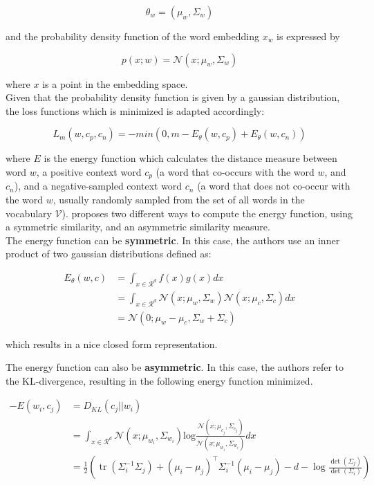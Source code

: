 \documentclass[a4paper,12pt,twoside,openright]{report}
\begin{document}
$$
\theta_w = ( \mu_w,  \Sigma_w)
$$

and the probability density function of the word embedding $x_w$ is expressed by

\begin{equation}
p(x; w) = \mathcal{N}\left(x ; \mu_{w}, \Sigma_{w}\right)
\end{equation}

where $x$ is a point in the embedding space. \\

Given that the probability density function is given by a gaussian distribution, the loss functions which is minimized is adapted accordingly:

\begin{equation}
L_m(w, c_p, c_n) = - min(0, m - E_\theta(w, c_p) + E_\theta(w, c_n) )
\end{equation}

where $E$ is the energy function which calculates the distance measure between word $w$, a positive context word $c_p$ (a word that co-occurs with the word $w$, and $c_n$), and a negative-sampled context word $c_n$ (a word that does not co-occur with the word $w$, usually randomly sampled from the set of all words in the vocabulary $\mathcal{V}$).
\cite{vilnis14} proposes two different ways to compute the energy function, using a symmetric similarity, and an asymmetric similarity measure. \\

The energy function can be \textbf{symmetric}.
In this case, the authors use an inner product of two gaussian distributions defined as:

\begin{align}
E_\theta(w, c) &= \int_{x \in \mathcal{R}^d} f(x)g(x) dx \\
&= \int_{x \in \mathcal{R}^d} \mathcal{N}(x; \mu_w, \Sigma_w) \mathcal{N}(x; \mu_c, \Sigma_c) dx \\
&= \mathcal{N}(0; \mu_w - \mu_c, \Sigma_w + \Sigma_c)
\end{align}

which results in a nice closed form representation. 

The energy function can also be \textbf{asymmetric}.
In this case, the authors refer to the KL-divergence, resulting in the following energy function minimized.

\begin{align}
-E(w_i, c_j) & = D_{KL}(c_j || w_i) \\
&= \int_{x \in \mathcal{R}^d} \mathcal{N}(x; \mu_{w_i}, \Sigma_{w_i}) \text{log} \frac{\mathcal{N}(x; \mu_{c_j}, \Sigma_{c_j})}{\mathcal{N}(x; \mu_{w_i}, \Sigma_{w_i})} dx \\
&= \frac{1}{2}\left(\operatorname{tr}\left(\Sigma_{i}^{-1} \Sigma_{j}\right)+\left(\mu_{i}-\mu_{j}\right)^{\top} \Sigma_{i}^{-1}\left(\mu_{i}-\mu_{j}\right)-d-\log \frac{\operatorname{det}\left(\Sigma_{j}\right)}{\operatorname{det}\left(\Sigma_{i}\right)}\right)
\end{align}
\end{document}

